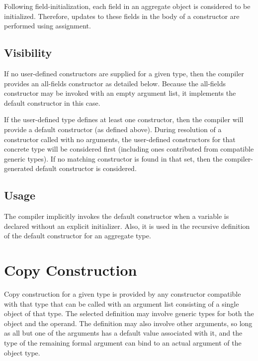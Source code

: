 \begin{note}

Following field-initialization, each field in an aggregate object is considered
to be initialized.  Therefore, updates to these fields in the body of a
constructor are performed using assignment.

\end{note}

\subsection{Visibility}

If no user-defined constructors are supplied for a given type, then the compiler
provides an all-fields constructor as detailed below.  Because the all-fields
constructor may be invoked with an empty argument list, it implements the
default constructor in this case.

If the user-defined type defines at least one constructor, then the compiler
will provide a default constructor (as defined above).  During resolution of a
constructor called with no arguments, the user-defined constructors for that
concrete type will be considered first (including ones contributed from
compatible generic types).  If no matching constructor is found in that set,
then the compiler-generated default constructor is considered.

\subsection{Usage}

The compiler implicitly invokes the default constructor when a variable is
declared without an explicit initializer.  Also, it is used in the recursive
definition of the default constructor for an aggregate type.



\section{Copy Construction}

Copy construction for a given type is provided by any constructor compatible
with that type that can be called with an argument list consisting of a single
object of that type.  The selected definition may involve generic types for both
the object and the operand.  The definition may also involve other arguments, so
long as all but one of the arguments has a default value associated with it, and
the type of the remaining formal argument can bind to an actual argument of the
object type.

